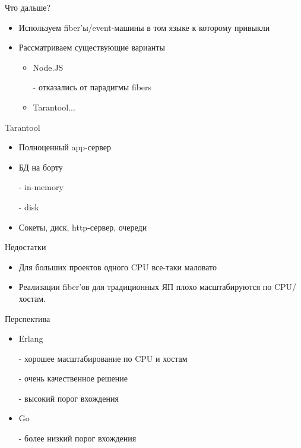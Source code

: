 \documentclass[aspectratio=169]{beamer}
\begin{document}
\begin{frame}{Что дальше?}
    \begin{itemize}
        \pause\item Используем fiber'ы/event-машины
            в том языке к которому привыкли
        \pause\item Рассматриваем существующие варианты
            \begin{itemize}
                \item\pause Node.JS
                    \pause\par - отказались от парадигмы fibers
                \item\pause Tarantool...
            \end{itemize}
    \end{itemize}
\end{frame}


\begin{frame}{Tarantool}
    \begin{itemize}
        \pause\item Полноценный app-сервер
        \pause\item БД на борту
            \pause\par - in-memory
            \pause\par - disk
        \pause\item Сокеты, диск, http-сервер, очереди
    \end{itemize}
\end{frame}

\begin{frame}{Недостатки}
    \begin{itemize}
        \pause\item Для больших проектов одного CPU все-таки маловато
        \pause\item Реализации fiber'ов для традиционных
            ЯП плохо масштабируются по CPU/хостам.
    \end{itemize}
\end{frame}

\begin{frame}{Перспектива}
    \begin{itemize}
        \pause\item Erlang
            \pause\par - хорошее масштабирование по CPU и хостам
            \pause\par - очень качественное решение
            \pause\par - высокий порог вхождения
        \pause\item Go
            \pause\par - более низкий порог вхождения
    \end{itemize}
\end{frame}
\end{document}
